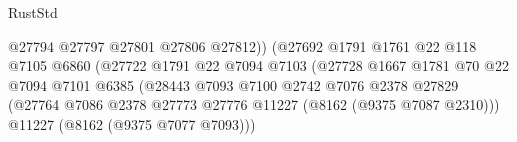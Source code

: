 \begin{lexlean}{RustStd}
\begin{coremodule}
                                                        @27794
                                                        @27797
                                                        @27801
                                                        @27806
                                                        @27812))
                                                    (@27692
                                                      @1791
                                                      @1761
                                                      @22
                                                      @118
                                                      @7105
                                                      @6860
                                                      (@27722
                                                        @1791
                                                        @22
                                                        @7094
                                                        @7103
                                                        (@27728
                                                          @1667
                                                          @1781
                                                          @70
                                                          @22
                                                          @7094
                                                          @7101
                                                          @6385
                                                          (@28443
                                                            @7093
                                                            @7100
                                                            @2742
                                                            @7076
                                                            @2378
                                                            @27829
                                                            (@27764
                                                              @7086
                                                              @2378
                                                              @27773
                                                              @27776
                                                              @11227
                                                              (@8162 (@9375 @7087 @2310)))
                                                            @11227
                                                            (@8162 (@9375 @7077 @7093)))

\end{coremodule}
\end{lexlean}
